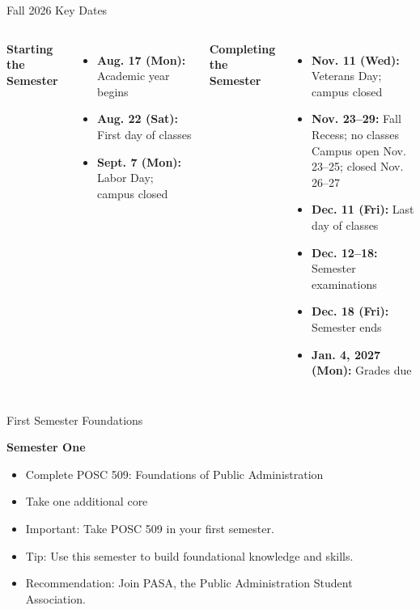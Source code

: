\documentclass[10pt,aspectratio=169]{beamer}
\begin{document}
\begin{frame}{Fall 2026 Key Dates}
\small
\begin{columns}[T,onlytextwidth]
  \textbf{Starting the Semester}
  \begin{itemize}\setlength{\itemsep}{4pt}
    \item \textbf{Aug. 17 (Mon):} Academic year begins
    \item \textbf{Aug. 22 (Sat):} First day of classes
    \item \textbf{Sept. 7 (Mon):} Labor Day; campus closed
  \end{itemize}

  \textbf{Completing the Semester}
  \begin{itemize}\setlength{\itemsep}{3pt}
    \item \textbf{Nov. 11 (Wed):} Veterans Day; campus closed
    \item \textbf{Nov. 23--29:} Fall Recess; no classes\\
      \footnotesize Campus open Nov. 23--25; closed Nov. 26--27
    \item \textbf{Dec. 11 (Fri):} Last day of classes
    \item \textbf{Dec. 12--18:} Semester examinations
    \item \textbf{Dec. 18 (Fri):} Semester ends
    \item \textbf{Jan. 4, 2027 (Mon):} Grades due
  \end{itemize}
\end{columns}
\end{frame}

\begin{frame}{First Semester Foundations}
\begin{large}
\textbf{Semester One}
\begin{itemize}
  \item Complete POSC 509: Foundations of Public Administration
  \item Take one additional core
  \item \alert{Important:} Take POSC 509 in your first semester.
  \item \alert{Tip:} Use this semester to build foundational knowledge and skills.
  \item \alert{Recommendation:} Join PASA, the Public Administration Student Association.
\end{itemize}
\end{large}
\end{frame}
\end{document}
